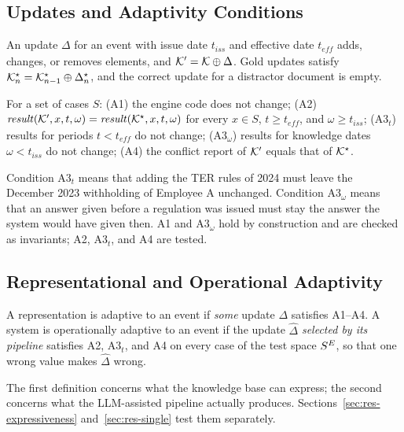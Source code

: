 \subsection{Updates and Adaptivity Conditions}
An update $\Delta$ for an event with issue date $t_{\mathit{iss}}$ and effective date $t_{\mathit{eff}}$ adds, changes, or removes elements, and $\mathcal{K}' = \mathcal{K} \oplus \Delta$. Gold updates satisfy $\mathcal{K}^{\star}_n = \mathcal{K}^{\star}_{n-1} \oplus \Delta^{\star}_n$, and the correct update for a distractor document is empty.

\begin{definition}
\label{def:conditions}
For a set of cases $S$: (A1) the engine code does not change; (A2) $\mathit{result}(\mathcal{K}', x, t, \omega) = \mathit{result}(\mathcal{K}^{\star}, x, t, \omega)$ for every $x \in S$, $t \geq t_{\mathit{eff}}$, and $\omega \geq t_{\mathit{iss}}$; (A3$_t$) results for periods $t < t_{\mathit{eff}}$ do not change; (A3$_\omega$) results for knowledge dates $\omega < t_{\mathit{iss}}$ do not change; (A4) the conflict report of $\mathcal{K}'$ equals that of $\mathcal{K}^{\star}$.
\end{definition}

Condition A3$_t$ means that adding the TER rules of 2024 must leave the December 2023 withholding of Employee A unchanged. Condition A3$_\omega$ means that an answer given before a regulation was issued must stay the answer the system would have given then. A1 and A3$_\omega$ hold by construction and are checked as invariants; A2, A3$_t$, and A4 are tested.

\subsection{Representational and Operational Adaptivity}
\begin{definition}[Adaptivity]
\label{def:adapt}
A representation is adaptive to an event if \emph{some} update $\Delta$ satisfies A1--A4. A system is operationally adaptive to an event if the update $\hat{\Delta}$ \emph{selected by its pipeline} satisfies A2, A3$_t$, and A4 on every case of the test space $S^{E}$, so that one wrong value makes $\hat{\Delta}$ wrong.
\end{definition}

The first definition concerns what the knowledge base can express; the second concerns what the LLM-assisted pipeline actually produces. Sections~\ref{sec:res-expressiveness} and~\ref{sec:res-single} test them separately.

